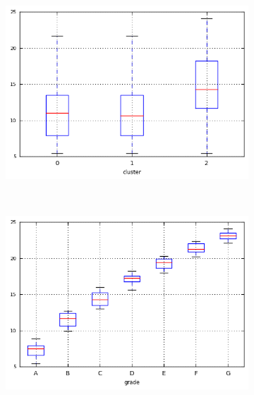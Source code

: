 \begin{anexosenv}
\begin{figure}[ht!]
\begin{subfigure}[t]{0.45\textwidth}
        \end{subfigure}
\end{figure}



\begin{figure}[ht!]
    \centering
                \caption{\emph{Boxplots} de int\textunderscore rate\textunderscore float}
        \begin{subfigure}[t]{0.45\textwidth}
            \centering

            \centerline{\includegraphics[width=1.05\textwidth]{img/int_rate_float_by_cluster}}
        \end{subfigure}%
        ~ 
        \begin{subfigure}[t]{0.45\textwidth}
            \centering
   
            \centerline{\includegraphics[width=1.05\textwidth]{img/int_rate_float_by_grade}}


\end{subfigure}
\end{figure}
\end{anexosenv}
